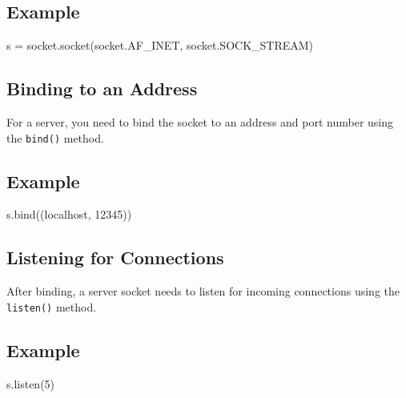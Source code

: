 \documentclass[
  letterpaper,
  DIV=11,
  numbers=noendperiod]{scrreprt}
\newenvironment{Shaded}{\begin{snugshade}}{\end{snugshade}}
\newcommand{\DecValTok}[1]{\textcolor[rgb]{0.68,0.00,0.00}{#1}}
\newcommand{\NormalTok}[1]{\textcolor[rgb]{0.00,0.23,0.31}{#1}}
\newcommand{\OperatorTok}[1]{\textcolor[rgb]{0.37,0.37,0.37}{#1}}
\newcommand{\StringTok}[1]{\textcolor[rgb]{0.13,0.47,0.30}{#1}}
\begin{document}
\subsection{Example}\label{example-52}

\begin{Shaded}
\begin{Highlighting}[]
\NormalTok{s }\OperatorTok{=}\NormalTok{ socket.socket(socket.AF\_INET, socket.SOCK\_STREAM)}
\end{Highlighting}
\end{Shaded}

\subsection{Binding to an Address}\label{binding-to-an-address}

For a server, you need to bind the socket to an address and port number
using the \texttt{bind()} method.

\subsection{Example}\label{example-53}

\begin{Shaded}
\begin{Highlighting}[]
\NormalTok{s.bind((}\StringTok{\textquotesingle{}localhost\textquotesingle{}}\NormalTok{, }\DecValTok{12345}\NormalTok{))}
\end{Highlighting}
\end{Shaded}

\subsection{Listening for Connections}\label{listening-for-connections}

After binding, a server socket needs to listen for incoming connections
using the \texttt{listen()} method.

\subsection{Example}\label{example-54}

\begin{Shaded}
\begin{Highlighting}[]
\NormalTok{s.listen(}\DecValTok{5}\NormalTok{)}
\end{Highlighting}
\end{Shaded}
\end{document}
